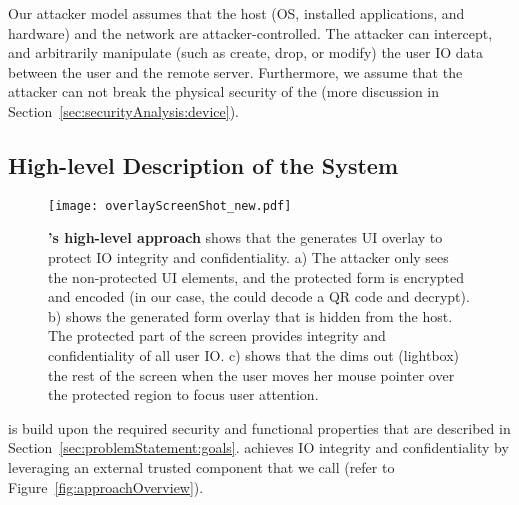  Our attacker model assumes that the host (OS, installed applications, and hardware) and the network are attacker-controlled. The attacker can intercept, and arbitrarily manipulate (such as create, drop, or modify) the user IO data between the user and the remote server. Furthermore, we assume that the attacker can not break the physical security of the \device (more discussion in Section~\ref{sec:securityAnalysis:device}).



\subsection{High-level Description of the System}

\begin{figure}[t]
\centering
\texttt{[image: overlayScreenShot\_new.pdf]}
\caption{\textbf{\name's high-level approach} shows that the \device generates UI overlay to protect IO integrity and confidentiality. a) The attacker only sees the non-protected UI elements, and the protected form is encrypted and encoded (in our case, the \device could decode a QR code and decrypt). b) shows the \device generated form overlay that is hidden from the host. The protected part of the screen provides integrity and confidentiality of all user IO. c) shows that the \device dims out (lightbox) the rest of the screen when the user moves her mouse pointer over the protected region to focus user attention.}
\spacesave
\label{fig:screenshot_1}
\end{figure}

\name is build upon the required security and functional properties that are described in Section~\ref{sec:problemStatement:goals}. \name achieves IO integrity and confidentiality by leveraging an external trusted component that we call \device (refer to Figure~\ref{fig:approachOverview}). 

